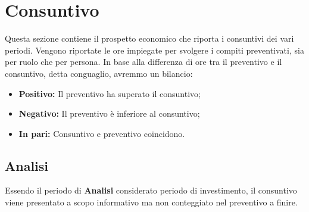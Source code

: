 \section{Consuntivo}
Questa sezione contiene il prospetto economico che riporta i consuntivi dei vari periodi. Vengono riportate le ore impiegate per svolgere i compiti preventivati, sia per ruolo che per persona. In base alla differenza di ore tra il preventivo e il consuntivo, detta conguaglio, avremmo un bilancio: \\
\begin{itemize}
	\item \textbf{Positivo:} Il preventivo ha superato il consuntivo;
	\item \textbf{Negativo:} Il preventivo è inferiore al consuntivo;
	\item \textbf{In pari:} Consuntivo e preventivo coincidono. \\
\end{itemize}
	\subsection{Analisi}
	Essendo il periodo di \textbf{Analisi} considerato periodo di investimento, il consuntivo viene presentato a scopo informativo ma non conteggiato nel preventivo a finire.
